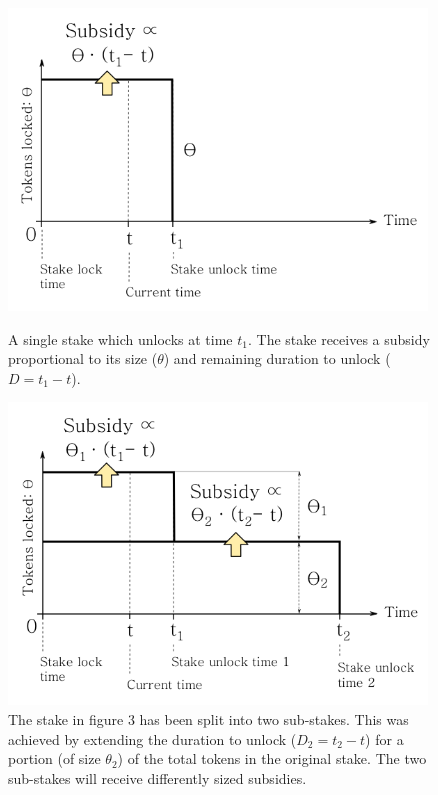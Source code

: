 \documentclass[longbibliography,nofootinbib]{revtex4-1}
\begin{document}
\begin{figure}[h!]
 \centering
    \begin{minipage}{0.48\textwidth}
        \centering
        \includegraphics[width=0.99\textwidth]{graphs/one-step.png}
        \caption{A single stake which unlocks at time $t_1$. The stake receives a subsidy proportional to its size ($\theta$) and remaining duration to unlock ($D = t_1 - t$).}
    \end{minipage}\hfill
    \begin{minipage}{0.48\textwidth}
        \centering
        \includegraphics[width=0.99\textwidth]{graphs/two-steps.png}
        \caption{The stake in figure 3 has been split into two sub-stakes. This was achieved by extending the duration to unlock ($D_2 = t_2 - t$) for a portion (of size $\theta_2$) of the total tokens in the original stake. The two sub-stakes will receive differently sized subsidies.}
    \end{minipage}
\end{figure}
\end{document}
